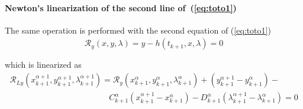 

 \paragraph{Newton's linearization of the second  line of~(\ref{eq:toto1})}
The same operation is performed with the second equation of (\ref{eq:toto1})
\begin{equation}
  \begin{array}{l}
    \mathcal R_y(x,y,\lambda)=y-h(t_{k+1},x,\lambda) =0\\ \\
  \end{array}
\end{equation}
which is linearized as
\begin{equation}
  \label{eq:NL9}
  \begin{array}{l}
    \mathcal R_{Ly}(x^{\alpha+1}_{k+1},y^{\alpha+1}_{k+1},\lambda^{\alpha+1}_{k+1}) = \mathcal
    R_{y}(x^{\alpha}_{k+1},y^{\alpha}_{k+1},\lambda^{\alpha}_{k+1}) +
    (y^{\alpha+1}_{k+1}-y^{\alpha}_{k+1})- \\[2mm] \qquad  \qquad \qquad \qquad  \qquad \qquad
    C^{\alpha}_{k+1}(x^{\alpha+1}_{k+1}-x^{\alpha}_{k+1}) - D^{\alpha}_{k+1}(\lambda^{\alpha+1}_{k+1}-\lambda^{\alpha}_{k+1})=0
  \end{array}
\end{equation}

